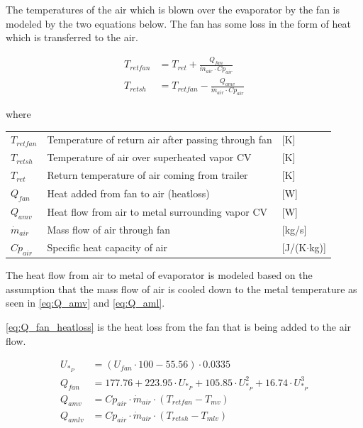 \medskip
The temperatures of the air which is blown over the evaporator by the fan is modeled by the two equations below. The fan has some loss in the form of heat which is transferred to the air.

\begin{align}
	T_{retfan} 		& = T_{ret} + \frac{Q_{fan}}{\dot{m}_{air} \cdot Cp_{air}} 		\label{eq:T_retfan} 		\\
	T_{retsh} 		& = T_{retfan} - \frac{Q_{amv}}{\dot{m}_{air} \cdot Cp_{air}} 	\label{eq:T_retsh}
\end{align}

where

\begin{center}
	\begin{tabular}{l p{10cm} l}
		$T_{retfan}$    & Temperature of return air after passing through fan & [\si{K}]                          \\
		$T_{retsh}$     & Temperature of air over superheated vapor CV        & [\si{K}]                          \\
		$T_{ret}$       & Return temperature of air coming from trailer       & [\si{K}]                          \\
		$Q_{fan}$       & Heat added from fan to air (heatloss)               & [\si{W}]                          \\
		$Q_{amv}$       & Heat flow from air to metal surrounding vapor CV    & [\si{W}]                          \\
		$\dot{m}_{air}$ & Mass flow of air through fan                        & [\si{kg}/\si{s}]                  \\
		$Cp_{air}$      & Specific heat capacity of air                       & [\si{J}/(\si{K}$ \cdot $\si{kg})]
	\end{tabular}
\end{center}

\medskip
The heat flow from air to metal of evaporator is modeled based on the assumption that the mass flow of air is cooled down to the metal temperature as seen in \cref{eq:Q_amv} and \cref{eq:Q_aml}.

\cref{eq:Q_fan_heatloss} is the heat loss from the fan that is being added to the air flow.

\begin{align}
	U_{*_P} & = \left( U_{fan}\cdot 100 - 55.56 \right) \cdot 0.0335                                         \\
	Q_{fan} & = 177.76 + 223.95 \cdot U_{*_P} + 105.85 \cdot U_{*_P}^2 + 16.74 \cdot U_{*_P}^3	\label{eq:Q_fan_heatloss} \\
	Q_{amv} & = Cp_{air} \cdot \dot{m}_{air} \cdot (T_{retfan} - T_{mv}) 	\label{eq:Q_amv}                                \\
	Q_{amlv} & = Cp_{air} \cdot \dot{m}_{air} \cdot (T_{retsh} - T_{mlv}) 	\label{eq:Q_aml}
\end{align}

